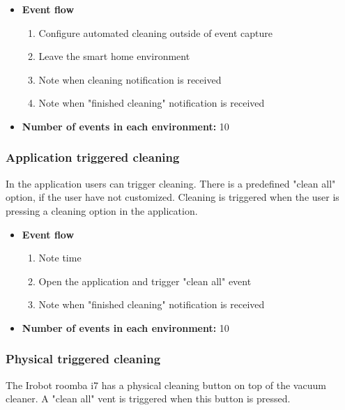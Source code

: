 \begin{itemize}
    \item \textbf{Event flow} \begin{enumerate}
                                    \item Configure automated cleaning outside of event capture
                                    \item Leave the smart home environment
                                    \item Note when cleaning notification is received
                                    \item Note when "finished cleaning" notification is received
                                \end{enumerate}
    \item \textbf{Number of events in each environment:} 10
\end{itemize}

\subsubsection{Application triggered cleaning}
In the application users can trigger cleaning. There is a predefined "clean all" option, if the user have not customized. Cleaning is triggered when the user is pressing a cleaning option in the application.

\begin{itemize}
    \item \textbf{Event flow} \begin{enumerate}
                                    \item Note time
                                    \item Open the application and trigger "clean all" event
                                    \item Note when "finished cleaning" notification is received
                                \end{enumerate}
    \item \textbf{Number of events in each environment:} 10
\end{itemize}

\subsubsection{Physical triggered cleaning}
The Irobot roomba i7 has a physical cleaning button on top of the vacuum cleaner. A "clean all" vent is triggered when this button is pressed.


